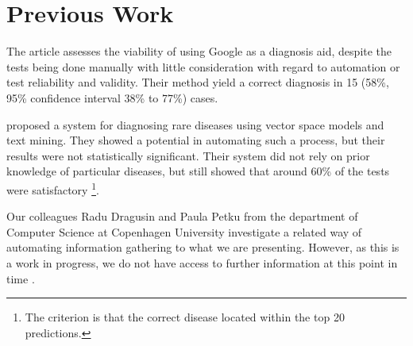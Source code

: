 \documentclass[10pt,letterpaper,final]{article}
\begin{document}
\section{Previous Work}
\label{chap:previouswork}
The article \cite{googlingdiagnosis} assesses the viability of using
Google as a diagnosis aid, despite the tests being done manually with
little consideration with regard to automation or test reliability and
validity. Their method yield a correct diagnosis in 15 (58\%, 95\%
confidence interval 38\% to 77\%) cases.


\cite{jensenandersen} proposed a system for diagnosing rare diseases
using vector space models and text mining. They showed a potential in
automating such a process, but their results were not statistically
significant. Their system did not rely on prior knowledge of particular
diseases, but still showed that around 60\% of the tests were
satisfactory \footnote{The criterion is that the correct disease located
within the top 20 predictions.}.

Our colleagues Radu Dragusin and Paula Petku from the department of
Computer Science at Copenhagen University investigate a related way of
automating information gathering to what we are presenting. However, as
this is a work in progress, we do not have access to further information
at this point in time \cite{radupaula}.







\end{document}
